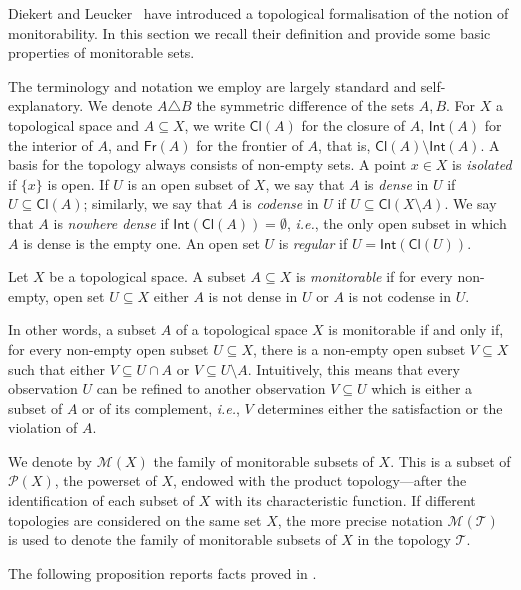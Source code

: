 \documentclass{lmcs}
\newcommand{\Cl}[1]{\mathsf{Cl}(#1)}
\newcommand{\Int}[1]{\mathsf{Int}(#1)}
\newcommand{\Fr}[1]{\mathsf{Fr}(#1)}
\def\ie{{\em i.e.}}
\begin{document}
Diekert and Leucker~\cite{dieker2014} have introduced a topological formalisation of the notion of monitorability.
In this section we recall their definition and provide some basic properties of monitorable sets. 

The terminology and notation we employ are largely standard and self-explanatory.
We denote $A\triangle B$ the symmetric difference of the sets $A,B$.
For $X$ a topological space and $A\subseteq X$, we write 
$\Cl{A}$ for the closure of $A$, 
$\Int{A}$ for the interior of $A$, and 
$\Fr{A}$ for the frontier of $A$, that is, $\Cl{A}\setminus\Int{A}$.
A basis for the topology always consists of non-empty sets.
A point $x\in X$ is \emph{isolated} if $\{ x\} $ is open.
If $U$ is an open subset of $X$, we say that $A$ is \emph{dense} in $U$ if $U\subseteq \Cl{A} $; similarly, we say that $A$ is \emph{codense} in $U$ if $U\subseteq \Cl{X\setminus A} $.
We say that $A$ is \emph{nowhere dense} if $\Int{\Cl{A}} = \emptyset$, \ie, the only open subset in which $A$ is dense is the empty one.
An open set $U$ is \emph{regular} if $U= \Int{ \Cl{U} } $.

\begin{defi}
Let $X$ be a topological space.
A subset $A\subseteq X$ is \emph{monitorable} if for every non-empty, open set $U\subseteq X$ either $A$ is not dense in $U$ or $A$ is not codense in $U$.
\end{defi}

In other words, a subset $A$ of a topological space $X$ is monitorable if and only if, for every non-empty open subset $U\subseteq X$, there is a non-empty open subset $V\subseteq X$ such that 
either $V\subseteq U\cap A$ or $V\subseteq U \setminus A$. 
Intuitively, this means that every observation $U$ can be refined to another observation $V\subseteq U$  
which is either a subset of $A$ or of its complement, \ie, $V$ determines either the satisfaction or the violation of $A$. 

We denote by $ \mathcal M (X)$ the family of monitorable subsets of $X$.
This is a subset of $ \mathcal P (X)$, the powerset of $X$, endowed with the product topology---after the identification of each subset of $X$ with its characteristic function.
If different topologies are considered on the same set $X$, the more precise notation $ \mathcal M ( \mathcal T )$ is used to denote the family of monitorable subsets of $X$ in the topology $ \mathcal T $.

The following proposition reports facts proved in \cite{dieker2014}.
\end{document}
